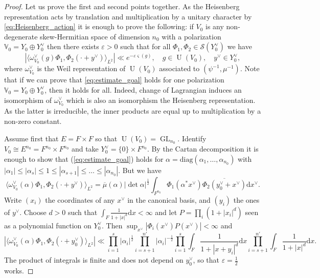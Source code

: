 \documentclass[letterpaper,11pt]{amsart}
\newcommand{\bV}{\mathbb{V}}
\newcommand{\cS}{\mathcal{S}}
\newcommand{\rd}{\mathrm{d}}
\newcommand{\<}{\negthickspace}
\newcommand{\valP}[1]{\left|#1\right|}
\DeclareMathOperator{\GL}{GL}
\DeclareMathOperator{\U}{U}
\theoremstyle{definition}
\theoremstyle{plain}
\theoremstyle{remark}
\numberwithin{equation}{section}
\begin{document}
\begin{proof}
    Let us prove the first and second points together. As the Heisenberg representation acts by translation and multiplication by a unitary character by \eqref{eq:Heisenberg_action}
    it is enough to prove the following: if $V_0$ is any non-degenerate skew-Hermitian space of dimension $n_0$ with a polarization $\bV_0 = Y_0 \oplus Y^\vee_0$ then there exists $\varepsilon>0$ such that for all $\Phi_1, \Phi_2 \in \cS(Y_0^\vee)$ we have
\begin{equation}
\label{eq:estimate_goal}
    \valP{ \langle \omega^\vee_{V_0}(g)\Phi_1, \Phi_2(\cdot+y^\vee) \rangle_{L^2}} \ll e^{- \varepsilon \varsigma(g)}, \quad g \in \U(V_0), \quad y^\vee \in Y_0^\vee,
\end{equation}
where $\omega^\vee_{V_0}$ is the Weil representation of $\U(V_0)$ associated to $(\psi^{-1},\mu^{-1})$. Note that if we can prove that \eqref{eq:estimate_goal} holds for one polarization $\bV_0 = Y_0 \oplus Y_0^\vee$, then it holds for all. Indeed, change of Lagrangian induces an isomorphism of $\omega_{V_0}^\vee$ which is also an isomorphism the Heisenberg representation. As the latter is irreducible, the inner products are equal up to multiplication by a non-zero constant. 

Assume first that $E=F\times F$ so that $\U(V_0)=\GL_{n_0}$. Identify $V_0 \cong E^{n_0}=F^{n_0} \times F^{n_0}$ and take $Y^\vee_0=\{0\} \times F^{n_0}$. By the Cartan decomposition it is enough to show that (\ref{eq:estimate_goal}) holds for $\alpha=\mathrm{diag}(\alpha_1, \hdots, \alpha_{n_0})$ with $\valP{\alpha_1} \leq  \valP{\alpha_s} \leq 1 \leq \valP{\alpha_{s+1}} \leq \hdots \leq \valP{\alpha_{n_0}}$. But we have 
\begin{equation*}
\langle\omega^\vee_{V_0}(\alpha)\Phi_1,\Phi_2(\cdot+y^\vee)\rangle_{L^2}=\overline{\mu}(\alpha)\valP{ \det \alpha}^{\frac{1}{2}} \int_{F^{n_0}} \Phi_1(\alpha^* x^\vee) \overline{\Phi_2(y_0^\vee+x^\vee)} \rd x^\vee.
\end{equation*}
Write $(x_i)$ the coordinates of any $x^\vee$ in the canonical basis, and $(y_i)$ the ones of $y^\vee$. Choose $d>0$ such that $\int_{F} \frac{1}{1+\valP{x}^d} \rd x < \infty$ and let $P=\prod_i (1+\valP{x_i}^d)$ seen as a polynomial function on $Y^\vee_0$. Then $\sup_{x^\vee} \valP{\Phi_i(x^\vee)P(x^\vee)} < \infty$ and
\begin{equation*}
    \valP{\langle \omega^\vee_{V_0}(\alpha)\Phi_1,\Phi_2(\cdot+y_0^\vee)\rangle_{L^2}} \ll \prod_{i=1}^s \valP{\alpha_i}^{\frac{1}{2}}\prod_{i=s+1}^{n'} \valP{\alpha_i}^{-\frac{1}{2}} \prod_{i=1}^{s}\int_{F} \frac{1}{1+\valP{x+y_i}^d} \rd x \prod_{i=s+1}^{n'}\int_{F} \frac{1}{1+\valP{x}^d} \rd x.
\end{equation*}
The product of integrals is finite and does not depend on $y_0^\vee$, so that $\varepsilon=\frac{1}{2}$ works.


\end{proof}
\end{document}
